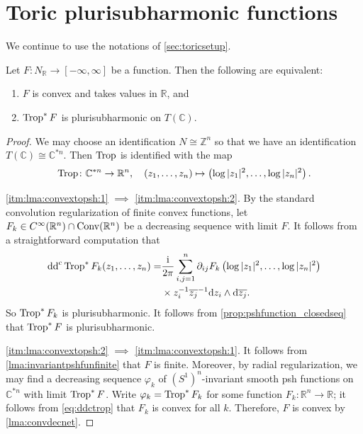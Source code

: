 \section{Toric plurisubharmonic functions}\label{sec:tpf}

We continue to use the notations of \cref{sec:toricsetup}.

\begin{lemma}\label{lma:convextopsh}
    Let $F\colon N_{\mathbb{R}}\rightarrow [-\infty,\infty]$ be a function. Then the following are equivalent:
    \begin{enumerate}
        \item\label{itm:lma:convextopsh:1} $F$ is convex and takes values in $\mathbb{R}$, and
        \item\label{itm:lma:convextopsh:2} $\operatorname{Trop}^*F$ is plurisubharmonic on $T(\mathbb{C})$.
    \end{enumerate}
\end{lemma}
\begin{proof}
We may choose an identification $N\cong \mathbb{Z}^n$ so that we have an identification $T(\mathbb{C})\cong \mathbb{C}^{*n}$.
Then $\operatorname{Trop}$ is identified with the map
\[
\operatorname{Trop}\colon \mathbb{C}^{*n}\rightarrow \mathbb{R}^n,\quad (z_1,\ldots,z_n)\mapsto \left(\log|z_1|^2,\ldots,\log|z_n|^2\right).
\]

\ref{itm:lma:convextopsh:1} $\implies$ \ref{itm:lma:convextopsh:2}. By the standard convolution regularization of finite convex functions, let $F_k\in C^{\infty}(\mathbb{R}^n)\cap \mathrm{Conv}(\mathbb{R}^n)$ be a decreasing sequence with limit $F$. It follows from a straightforward computation that
    \begin{equation}\label{eq:ddctrop}
    \begin{split}
    \mathrm{dd}^{\mathrm{c}} \operatorname{Trop}^*F_k(z_1,\ldots,z_n)
    =&\frac{\mathrm{i}}{2\pi} \sum_{i,j=1}^n \partial_{ij}F_k\left(\log|z_1|^2,\ldots,\log|z_n|^2\right)\\
    &\times z_i^{-1}\overline{z_j}^{-1}\mathrm{d}z_i\wedge \mathrm{d}\overline{z_j}.
    \end{split}
    \end{equation}
    So $\operatorname{Trop}^* F_k$ is plurisubharmonic. It follows from \cref{prop:pshfunction_closedseq} that $\operatorname{Trop}^* F$ is plurisubharmonic.

\ref{itm:lma:convextopsh:2} $\implies$ \ref{itm:lma:convextopsh:1}. It follows from \cref{lma:invariantpshfunfinite} that $F$ is finite. Moreover, by radial regularization, we may find a decreasing sequence $\varphi_k$ of $(S^1)^n$-invariant smooth psh functions on $\mathbb{C}^{*n}$ with limit $\operatorname{Trop}^*F$. Write $\varphi_k=\operatorname{Trop}^* F_k$ for some function $F_k\colon \mathbb{R}^n\rightarrow \mathbb{R}$; it follows from \eqref{eq:ddctrop} that $F_k$ is convex for all $k$. Therefore, $F$ is convex by \cref{lma:convdecnet}.
\end{proof}

